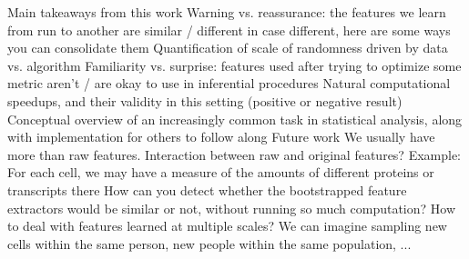 \documentclass[11pt]{article}
\begin{document}
\begin{outline}
  \1 Main takeaways from this work
    \2 Warning vs. reassurance: the features we learn from run to another are
    similar / different
      \3 in case different, here are some ways you can consolidate them
      \3 Quantification of scale of randomness driven by data vs. algorithm
    \2 Familiarity vs. surprise: features used after trying to optimize some
    metric aren't / are okay to use in inferential procedures
    \2 Natural computational speedups, and their validity in this setting
    (positive or negative result)
    \2 Conceptual overview of an increasingly common task in statistical
    analysis, along with implementation for others to follow along
  \1 Future work
    \2 We usually have more than raw features. Interaction between raw and
    original features?
      \3 Example: For each cell, we may have a measure of the amounts of
      different proteins or transcripts there
    \2 How can you detect whether the bootstrapped feature extractors would be
    similar or not, without running so much computation?
    \2 How to deal with features learned at multiple scales? We can imagine
    sampling new cells within the same person, new people within the same
    population, ...
\end{outline}



\end{document}
